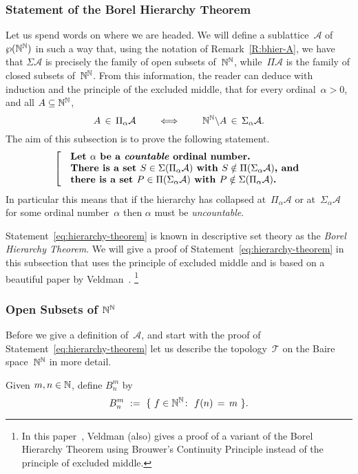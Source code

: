 \documentclass[main.tex]{subfiles}
\begin{document}
\subsubsection{Statement of the Borel Hierarchy Theorem}$\,$\\
Let us spend words on where we are headed.
We will define a sublattice~$\mathcal{A}$
of~$\wp(\mathbb{N}^{\mathbb{N}})$
in such a way that,
using the notation of Remark~\ref{R:bhier-A},
we have that
$\Sigma \mathcal{A}$
is  precisely the family of open subsets of~$\mathbb{N}^{\mathbb{N}}$,
while~$\Pi \mathcal{A}$ is the family
of closed subsets of~$\mathbb{N}^{\mathbb{N}}$.
From this information,
the reader can deduce with induction and the principle
of the excluded middle, that for every ordinal~$\alpha>0$,
and all $A\subseteq\mathbb{N}^{\mathbb{N}}$, 
\begin{equation}
\label{eq:bhier-complement}
A \,\in\, \Pi_\alpha \mathcal{A}
\qquad\iff\qquad
\mathbb{N}^{\mathbb{N}}\backslash A \,\in\, \Sigma_\alpha \mathcal{A}.
\end{equation}
The aim of this subsection
is to prove the following statement.
\begin{equation}
\label{eq:hierarchy-theorem}
\left[\quad
\begin{minipage}{.7\columnwidth}
\textbf{%
Let~$\alpha$ be a \emph{countable} ordinal number.\\
There is a set~$S\in \Sigma(\Pi_\alpha\mathcal{A})$
with $S\notin \Pi(\Sigma_\alpha\mathcal{A})$, and \\
there is a set $P\in\Pi(\Sigma_\alpha\mathcal{A})$
with $P\notin \Sigma(\Pi_\alpha\mathcal{A})$.}
\end{minipage}
\right.
\end{equation}
In particular
this means that if the hierarchy has collapsed
at~$\Pi_\alpha\mathcal{A}$
or at~$\Sigma_\alpha\mathcal{A}$
for some ordinal number~$\alpha$
then $\alpha$ must be \emph{uncountable}.

Statement~\eqref{eq:hierarchy-theorem}
is known in descriptive set theory
as the \emph{Borel Hierarchy Theorem}.
We will give a proof of Statement~\eqref{eq:hierarchy-theorem}
 in this subsection that
uses the principle of excluded middle
and is based on a beautiful paper by Veldman~\cite[paragraph 5]{Veldman08}.%
\footnote{
In this paper~\cite{Veldman08},
Veldman (also) gives
a proof of a variant of the Borel Hierarchy Theorem
using Brouwer's Continuity Principle
instead of the principle of excluded middle.}

\subsubsection{Open Subsets of $\mathbb{N}^{\mathbb{N}}$}$\,$\label{SSS:bhier-open}\\
Before we give a definition of~$\mathcal{A}$,
and start with the proof of Statement~\eqref{eq:hierarchy-theorem}
let us describe the topology~$\mathcal{T}$ 
on the Baire space~$\mathbb{N}^{\mathbb{N}}$ in more detail.
\begin{dfn}
Given $m,n\in\mathbb{N}$, define $B^m_n$ by
\begin{equation*}
B_n^m\ :=\ \{ \ f\in\mathbb{N}^{\mathbb{N}}\colon\  f(n) \,=\, m \ \}.
\end{equation*}
\end{dfn}
\end{document}
